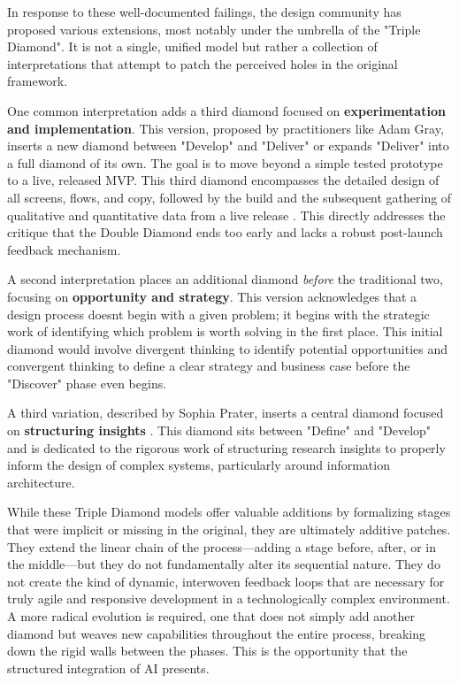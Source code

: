 \documentclass[
  12pt,
  a4paper,
  bibliography=totoc,
  numbers=noenddot
]{scrartcl}
\begin{document}
In response to these well-documented failings, the design community has
proposed various extensions, most notably under the umbrella of the
"Triple Diamond".\cite{researchgate2025triple} It is not a single, unified model
but rather a collection of interpretations that attempt to patch the
perceived holes in the original framework.\cite{equalexperts2025innovation}

One common interpretation adds a third diamond focused on
\textbf{experimentation and implementation}. This version, proposed by
practitioners like Adam Gray, inserts a new diamond between "Develop"
and "Deliver" or expands "Deliver" into a full diamond of its
own.\cite{smartinterface2025double} The goal is to move beyond a simple tested
prototype to a live, released MVP. This third diamond encompasses the
detailed design of all screens, flows, and copy, followed by the build
and the subsequent gathering of qualitative and quantitative data from a
live release \cite{uxdesign2025why}. This directly addresses the critique
that the Double Diamond ends too early and lacks a robust post-launch
feedback mechanism.

A second interpretation places an additional diamond \emph{before} the
traditional two, focusing on \textbf{opportunity and
strategy}.\cite{equalexperts2025innovation} This version acknowledges that a design
process doesn\textquotesingle t begin with a given problem; it begins
with the strategic work of identifying which problem is worth solving in
the first place. This initial diamond would involve divergent thinking
to identify potential opportunities and convergent thinking to define a
clear strategy and business case before the "Discover" phase even
begins.

A third variation, described by Sophia Prater, inserts a central diamond
focused on \textbf{structuring insights} \cite{medium2025double}. This
diamond sits between "Define" and "Develop" and is dedicated to the
rigorous work of structuring research insights to properly inform the
design of complex systems, particularly around information architecture.

While these Triple Diamond models offer valuable additions by
formalizing stages that were implicit or missing in the original, they
are ultimately additive patches. They extend the linear chain of the
process---adding a stage before, after, or in the middle---but they do
not fundamentally alter its sequential nature. They do not create the
kind of dynamic, interwoven feedback loops that are necessary for truly
agile and responsive development in a technologically complex
environment. A more radical evolution is required, one that does not
simply add another diamond but weaves new capabilities throughout the
entire process, breaking down the rigid walls between the phases. This
is the opportunity that the structured integration of AI presents.
\end{document}
